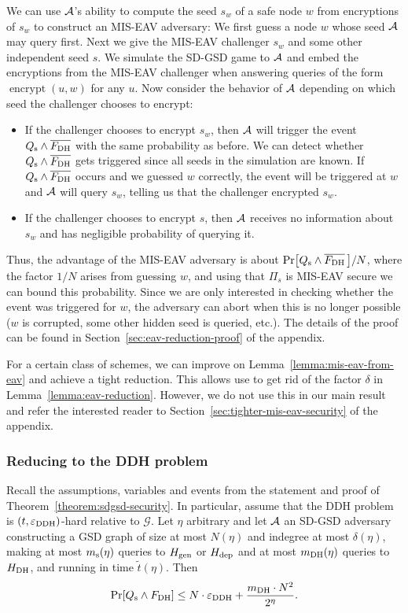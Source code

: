 
We can use $\mathcal{A}$'s ability to compute the seed $s_w$ of a safe node $w$ from encryptions of $s_w$ to construct an MIS-EAV adversary: We first guess a node $w$ whose seed $\mathcal{A}$ may query first. Next we give the MIS-EAV challenger $s_w$ and some other independent seed $s$. We simulate the SD-GSD game to $\mathcal{A}$ and embed the encryptions from the MIS-EAV challenger when answering queries of the form $\operatorname{encrypt}(u, w)$ for any $u$. Now consider the behavior of $\mathcal{A}$ depending on which seed the challenger chooses to encrypt:
\begin{itemize}
	\item If the challenger chooses to encrypt $s_w$, then $\mathcal{A}$ will trigger the event $Q_\mathrm{s} \land \overline{F_\mathrm{DH}}$ with the same probability as before. We can detect whether $Q_\mathrm{s} \land \overline{F_\mathrm{DH}}$ gets triggered since all seeds in the simulation are known. If $Q_\mathrm{s} \land \overline{F_\mathrm{DH}}$ occurs and we guessed $w$ correctly, the event will be triggered at $w$ and $\mathcal{A}$ will query $s_w$, telling us that the challenger encrypted $s_w$.
	\item If the challenger chooses to encrypt $s$, then $\mathcal{A}$ receives no information about $s_w$ and has negligible probability of querying it.
\end{itemize}
Thus, the advantage of the MIS-EAV adversary is about $\pr{\qs \land \overline{\fdh}\,}/N$, where the factor $1/N$ arises from guessing $w$, and using that $\Pi_s$ is MIS-EAV secure we can bound this probability. Since we are only interested in checking whether the event was triggered for $w$, the adversary can abort when this is no longer possible ($w$ is corrupted, some other hidden seed is queried, etc.). The details of the proof can be found in Section~\ref{sec:eav-reduction-proof} of the appendix.

For a certain class of schemes, we can improve on Lemma~\ref{lemma:mis-eav-from-eav} and achieve a tight reduction. This allows use to get rid of the factor $\delta$ in Lemma~\ref{lemma:eav-reduction}. However, we do not use this in our main result and refer the interested reader to Section~\ref{sec:tighter-mis-eav-security} of the appendix.

\subsubsection{Reducing to the DDH problem}

\begin{lemma} \label{lemma:dh-reduction}
	Recall the assumptions, variables and events from the statement and proof of Theorem~\ref{theorem:sdgsd-security}. In particular, assume that the DDH problem is $(t, \varepsilon_\mathrm{DDH})$-hard relative to $\mathcal{G}$. Let $\eta$ arbitrary and let $\mathcal{A}$ an SD-GSD adversary constructing a GSD graph of size at most $N(\eta)$ and indegree at most $\delta(\eta)$, making at most $m_\mathrm{s}(\eta)$ queries to $H_\mathrm{gen}$ or $H_\mathrm{dep}$ and at most $m_\mathrm{DH}(\eta)$ queries to $H_\mathrm{DH}$, and running in time $\tilde{t}(\eta)$. Then
	\[
		\pr{\qs \land \fdh} \le N \cdot \eddh + \frac{\mdh \cdot N^2}{2^{\eta}}.
	\]
\end{lemma}

